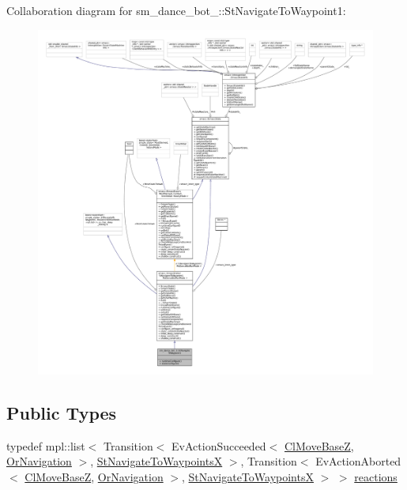 Collaboration diagram for sm\+\_\+dance\+\_\+bot\+\_\+:\+:St\+Navigate\+To\+Waypoint1\+:
\nopagebreak
\begin{figure}[H]
\begin{center}
\leavevmode
\includegraphics[width=350pt]{structsm__dance__bot__3_1_1StNavigateToWaypoint1__coll__graph}
\end{center}
\end{figure}
\subsection*{Public Types}
\begin{DoxyCompactItemize}
\item 
typedef mpl\+::list$<$ Transition$<$ Ev\+Action\+Succeeded$<$ \hyperlink{classmove__base__z__client_1_1ClMoveBaseZ}{Cl\+Move\+BaseZ}, \hyperlink{classsm__dance__bot__3_1_1OrNavigation}{Or\+Navigation} $>$, \hyperlink{structsm__dance__bot__3_1_1StNavigateToWaypointsX}{St\+Navigate\+To\+WaypointsX} $>$, Transition$<$ Ev\+Action\+Aborted$<$ \hyperlink{classmove__base__z__client_1_1ClMoveBaseZ}{Cl\+Move\+BaseZ}, \hyperlink{classsm__dance__bot__3_1_1OrNavigation}{Or\+Navigation} $>$, \hyperlink{structsm__dance__bot__3_1_1StNavigateToWaypointsX}{St\+Navigate\+To\+WaypointsX} $>$ $>$ \hyperlink{structsm__dance__bot__3_1_1StNavigateToWaypoint1_a8baf82b2287fdb1d80b8de5e5502c2a5}{reactions}
\end{DoxyCompactItemize}
